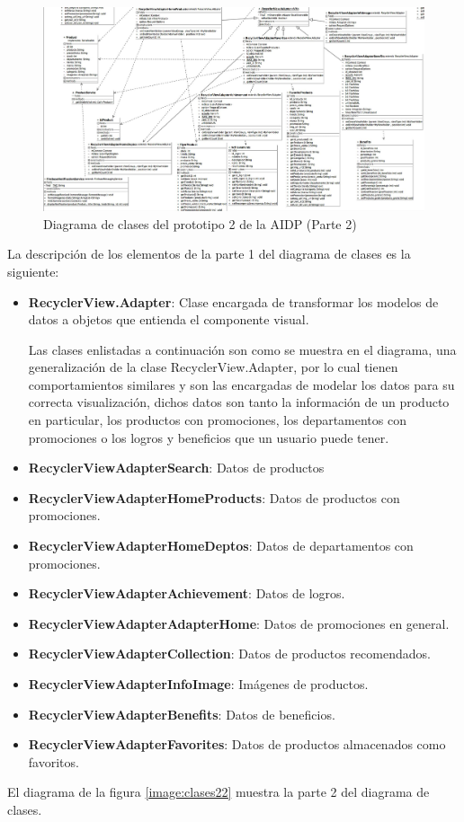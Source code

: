 \FloatBarrier
\begin{figure}[htbp!]
		\centering
			\includegraphics[width=1.1 \textwidth]{imagenes/aidp_clases/recycler3}
		\caption{Diagrama de clases del prototipo 2 de la AIDP (Parte 2)}
		\label{image:recycler3}
\end{figure}
\FloatBarrier
La descripción de los elementos de la parte 1 del diagrama de clases es la siguiente: 

\begin{itemize}
\item \textbf{RecyclerView.Adapter}: Clase encargada de transformar los modelos de datos a objetos que entienda el componente visual.
\\ \par 
Las clases enlistadas a continuación son como se muestra en el diagrama, una generalización de la clase RecyclerView.Adapter, por lo cual tienen comportamientos similares y son las encargadas de modelar los datos para su correcta visualización, dichos datos son tanto la información de un producto en particular, los productos con promociones, los departamentos con promociones o los logros y beneficios que un usuario puede tener.
\item \textbf{RecyclerViewAdapterSearch}: Datos de productos
\item \textbf{RecyclerViewAdapterHomeProducts}: Datos de productos con promociones.
\item \textbf{RecyclerViewAdapterHomeDeptos}: Datos de departamentos con promociones.
\item \textbf{RecyclerViewAdapterAchievement}: Datos de logros.
\item \textbf{RecyclerViewAdapterAdapterHome}: Datos de promociones en general.
\item \textbf{RecyclerViewAdapterCollection}: Datos de productos recomendados.
\item \textbf{RecyclerViewAdapterInfoImage}: Imágenes de productos.
\item \textbf{RecyclerViewAdapterBenefits}: Datos de beneficios.
\item \textbf{RecyclerViewAdapterFavorites}: Datos de productos almacenados como favoritos.
\end{itemize}
\newpage
El diagrama de la figura \ref{image:clases22} muestra la parte 2 del diagrama de clases.

